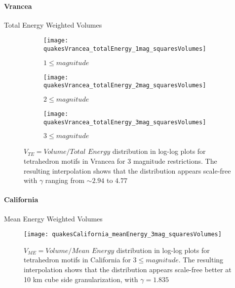 \paragraph{Vrancea} Total Energy Weighted Volumes
\begin{figure}[!h]
\begin{subfigure}{.99\textwidth}
  \centering
  \texttt{[image: quakesVrancea\_totalEnergy\_1mag\_squaresVolumes]}
  \caption{$1 \leq magnitude$}
  \label{fig:volumesVrTE1}
\end{subfigure}%

\begin{subfigure}{.99\textwidth}
  \centering
  \texttt{[image: quakesVrancea\_totalEnergy\_2mag\_squaresVolumes]}
  \caption{$2 \leq magnitude$}
  \label{fig:volumesVrTE2}
\end{subfigure}%

\begin{subfigure}{.99\textwidth}
  \centering
  \texttt{[image: quakesVrancea\_totalEnergy\_3mag\_squaresVolumes]}
  \caption{$3 \leq magnitude$}
  \label{fig:volumesVrTE3}
\end{subfigure}%

\caption{$V_{TE} = Volume/Total$ $Energy$ distribution in log-log plots for tetrahedron motifs in Vrancea for 3 magnitude restrictions. The resulting interpolation shows that the distribution appears scale-free with $\gamma$ ranging from $\sim 2.94$ to $4.77$}
\label{fig:tetrahedronsVolumesVrTE}
\end{figure}

\clearpage

\paragraph{California} Mean Energy Weighted Volumes
\begin{figure}[!h]

  \centering
  \texttt{[image: quakesCalifornia\_meanEnergy\_3mag\_squaresVolumes]}

\caption{$V_{ME} = Volume/Mean$ $Energy$ distribution in log-log plots for tetrahedron motifs in California for $3 \leq magnitude$. The resulting interpolation shows that the distribution appears scale-free better at 10 km cube side granularization, with $\gamma = 1.835$}
\label{fig:tetrahedronsVolumesCaME}
\end{figure}


